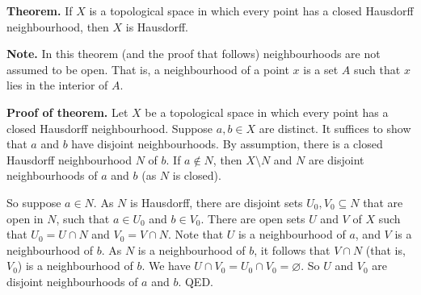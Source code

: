 \documentclass[12pt]{article}
\def\emptyset{\varnothing}
\begin{document}

{\bf Theorem.}
If $X$ is a topological space in which
every point has a closed Hausdorff neighbourhood,
then $X$ is Hausdorff.

{\bf Note.}
In this theorem (and the proof that follows)
neighbourhoods are not assumed to be open.
That is, a neighbourhood of a point $x$
is a set $A$ such that $x$ lies in the interior of $A$.

{\bf Proof of theorem.}
Let $X$ be a topological space in which
every point has a closed Hausdorff neighbourhood.
Suppose $a,b\in X$ are distinct.
It suffices to show that $a$ and $b$ have disjoint neighbourhoods.
By assumption, there is a closed Hausdorff neighbourhood $N$ of $b$.
If $a\notin N$, then $X\setminus N$ and $N$
are disjoint neighbourhoods of $a$ and $b$ (as $N$ is closed).

So suppose $a\in N$.
As $N$ is Hausdorff,
there are disjoint sets $U_0,V_0\subseteq N$
that are open in $N$, such that $a\in U_0$ and $b\in V_0$.
There are open sets $U$ and $V$ of $X$
such that $U_0=U\cap N$ and $V_0=V\cap N$.
Note that $U$ is a neighbourhood of $a$, and $V$ is a neighbourhood of $b$.
As $N$ is a neighbourhood of $b$,
it follows that $V\cap N$ (that is, $V_0$) is a neighbourhood of $b$.
We have $U\cap V_0=U_0\cap V_0=\emptyset$.
So $U$ and $V_0$ are disjoint neighbourhoods of $a$ and $b$.
QED.
\end{document}
